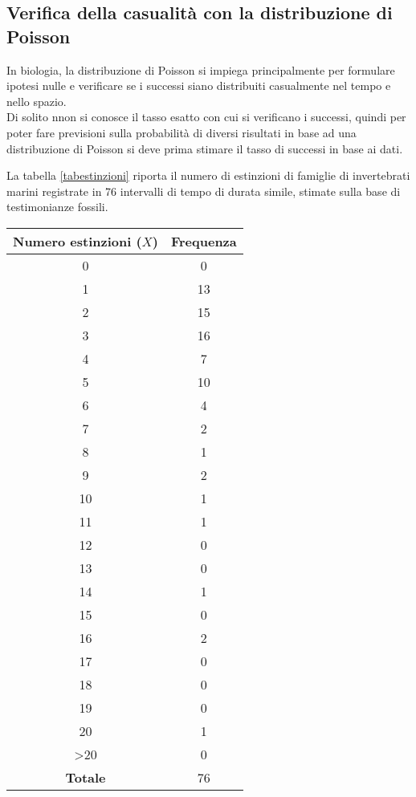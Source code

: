 \documentclass[drafts, 10pt]{book}
\newcounter{example}[section]
\begin{document}
\subsection{Verifica della casualità con la distribuzione di Poisson}
In biologia, la distribuzione di Poisson si impiega principalmente per formulare ipotesi nulle e verificare se i successi siano distribuiti casualmente nel tempo e nello spazio.
\\
Di solito nnon si conosce il tasso esatto con cui si verificano i successi, quindi per poter fare previsioni sulla probabilità di diversi risultati in base ad una distribuzione di Poisson si deve prima stimare il tasso di successi in base ai dati.
\begin{example}
La tabella \ref{tabestinzioni} riporta il numero di estinzioni di famiglie di invertebrati marini registrate in 76 intervalli di tempo di durata simile, stimate sulla base di testimonianze fossili.
\begin{table}[H]
        \centering
        \renewcommand\arraystretch{1.2}
        \begin{tabular}{c|c}
        \hline
        \textbf{Numero estinzioni ($X$)} & \textbf{Frequenza}\\
        \hline
        0 & 0 \\
        1 & 13 \\
        2 & 15 \\
        3 & 16 \\
        4 & 7 \\
        5 & 10 \\
        6 & 4 \\
        7 & 2 \\
        8 & 1 \\
        9 & 2 \\
        10 & 1 \\
        11 & 1 \\
        12 & 0 \\
        13 & 0 \\
        14 & 1 \\
        15 & 0 \\
        16 & 2 \\
        17 & 0 \\
        18 & 0 \\
        19 & 0 \\
        20 & 1 \\
        >20 & 0 \\
        \hline
        \textbf{Totale} & 76 \\

\end{tabular}
\end{table}
\end{example}
\end{document}
